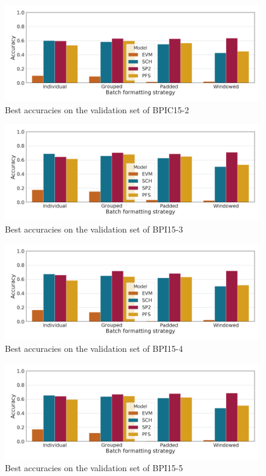 \begin{figure}
    \centering
    \includegraphics[width=\textwidth]{gfx/bpic2015_2/accuracies.png}
    \caption{Best accuracies on the validation set of BPIC15-2}
    \label{fig:max-accuracies-bpic2015-2}
\end{figure}
\begin{figure}
    \centering
    \includegraphics[width=\textwidth]{gfx/bpic2015_3/accuracies.png}
    \caption{Best accuracies on the validation set of BPI15-3}
    \label{fig:max-accuracies-bpic2015-3}
\end{figure}
\begin{figure}
    \centering
    \includegraphics[width=\textwidth]{gfx/bpic2015_4/accuracies.png}
    \caption{Best accuracies on the validation set of BPI15-4}
    \label{fig:max-accuracies-bpic2015-4}
\end{figure}
\begin{figure}
    \centering
    \includegraphics[width=\textwidth]{gfx/bpic2015_5/accuracies.png}
    \caption{Best accuracies on the validation set of BPI15-5}
    \label{fig:max-accuracies-bpic2015-5}
\end{figure}
